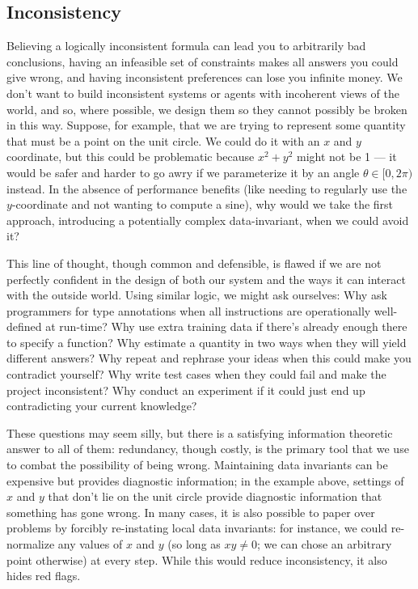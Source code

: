 \documentclass{article}
\begin{document}
	\begin{vfull}
		\subsection{Inconsistency} \label{sec:consistency-ethos}
	
		Believing a logically inconsistent formula can lead you to arbitrarily bad conclusions, having an infeasible set of constraints makes all answers you could give wrong, and having inconsistent preferences can lose you infinite money. We don't want to build inconsistent systems or agents with incoherent views of the world, and so, where possible, we design them so they cannot possibly be broken in this way. Suppose, for example, that we are trying to represent some quantity that must be a point on the unit circle. We could do it with an $x$ and $y$ coordinate, but this could be problematic because $x^2+ y^2$ might not be 1 --- it would be safer and harder to go awry if we parameterize it by an angle $\theta \in [0, 2\pi)$ instead. In the absence of performance benefits (like needing to regularly use the $y$-coordinate and not wanting to compute a sine), why would we take the first approach, introducing a potentially complex data-invariant, when we could avoid it?
		
		This line of thought, though common and defensible, is flawed if we are not perfectly confident in the design of both our system and the ways it can interact with the outside world. Using similar logic, we might ask ourselves: Why ask programmers for type annotations when all instructions are operationally well-defined at run-time?  Why use extra training data if there's already enough there to specify a function? Why estimate a quantity in two ways when they will yield different answers? Why repeat and rephrase your ideas when this could make you contradict yourself? Why write test cases when they could fail and make the project inconsistent? Why conduct an experiment if it could just end up contradicting your current knowledge?
		
		These questions may seem silly, but there is a satisfying information theoretic answer to all of them: redundancy, though costly, is the primary tool that we use to combat the possibility of being wrong. Maintaining data invariants can be expensive but provides diagnostic information; in the example above, settings of $x$ and $y$ that don't lie on the unit circle provide diagnostic information that something has gone wrong.
		In many cases, it is also possible to paper over problems by forcibly re-instating local data invariants: for instance, we could re-normalize any values of $x$ and $y$ (so long as $xy \neq 0$; we can chose an arbitrary point otherwise) at every step. While this would reduce inconsistency, it also hides red flags.
		

\end{vfull}
\end{document}
